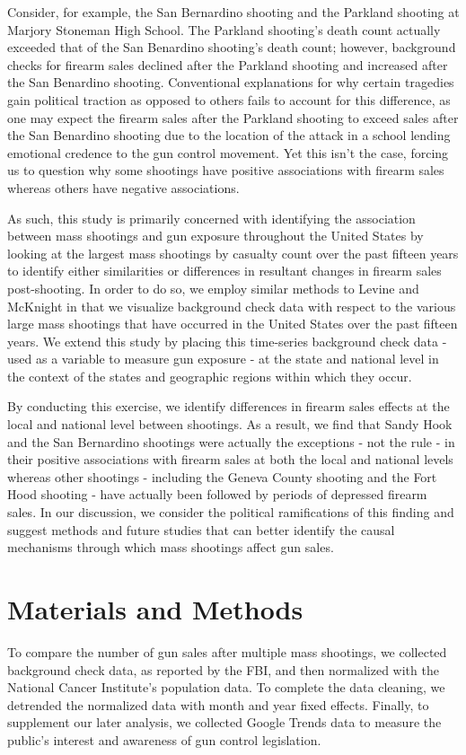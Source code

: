 \documentclass[9pt,twocolumn,twoside,lineno]{pnas-new}
\begin{document}
Consider, for example, the San Bernardino shooting and the Parkland shooting at Marjory Stoneman High School. The Parkland shooting's death count actually exceeded that of the San Benardino shooting's death count; however, background checks for firearm sales declined after the Parkland shooting and increased after the San Benardino shooting. Conventional explanations for why certain tragedies gain political traction as opposed to others fails to account for this difference, as one may expect the firearm sales after the Parkland shooting to exceed sales after the San Benardino shooting due to the location of the attack in a school lending emotional credence to the gun control movement. Yet this isn't the case, forcing us to question why some shootings have positive associations with firearm sales whereas others have negative associations. 

As such, this study is primarily concerned with identifying the association between mass shootings and gun exposure throughout the United States by looking at the largest mass shootings by casualty count over the past fifteen years to identify either similarities or differences in resultant changes in firearm sales post-shooting. In order to do so, we employ similar methods to Levine and McKnight in that we visualize background check data with respect to the various large mass shootings that have occurred in the United States over the past fifteen years. We extend this study by placing this time-series background check data - used as a variable to measure gun exposure - at the state and national level in the context of the states and geographic regions within which they occur. 

By conducting this exercise, we identify differences in firearm sales effects at the local and national level between shootings. As a result, we find that Sandy Hook and the San Bernardino shootings were actually the exceptions - not the rule - in their positive associations with firearm sales at both the local and national levels whereas other shootings - including the Geneva County shooting and the Fort Hood shooting - have actually been followed by periods of depressed firearm sales. In our discussion, we consider the political ramifications of this finding and suggest methods and future studies that can better identify the causal mechanisms through which mass shootings affect gun sales. 
\section*{Materials and Methods}
To compare the number of gun sales after multiple mass shootings, we collected background check data, as reported by the FBI, and then normalized with the National Cancer Institute's population data. To complete the data cleaning, we detrended the normalized data with month and year fixed effects. Finally, to supplement our later analysis, we collected Google Trends data to measure the public's interest and awareness of gun control legislation. 
\end{document}
